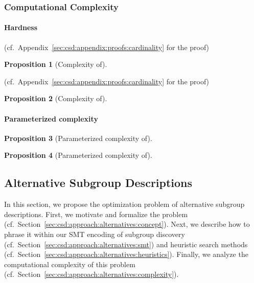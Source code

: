 \documentclass{article}
\newtheorem{proposition}{Proposition}
\theoremstyle{definition}
\begin{document}
\subsubsection{Computational Complexity}
\label{sec:csd:approach:cardinality:complexity}

\paragraph{Hardness}

(cf.~Appendix~\ref{sec:csd:appendix:proofs:cardinality} for the proof)

\begin{proposition}[Complexity of]
	\label{prop:csd:complexity-cardinality-perfect-box}
\end{proposition}

(cf.~Appendix~\ref{sec:csd:appendix:proofs:cardinality} for the proof)

\begin{proposition}[Complexity of]
	\label{prop:csd:complexity-cardinality-imperfect-box}
\end{proposition}

\paragraph{Parameterized complexity}

\begin{proposition}[Parameterized complexity of]
	\label{prop:csd:complexity-unconstrained-xp}
\end{proposition}

\begin{proposition}[Parameterized complexity of]
	\label{prop:csd:complexity-cardinality-xp}
\end{proposition}

\subsection{Alternative Subgroup Descriptions}
\label{sec:csd:approach:alternatives}

In this section, we propose the optimization problem of alternative subgroup descriptions.
First, we motivate and formalize the problem (cf.~Section~\ref{sec:csd:approach:alternatives:concept}).
Next, we describe how to phrase it within our SMT encoding of subgroup discovery (cf.~Section~\ref{sec:csd:approach:alternatives:smt}) and heuristic search methods (cf.~Section~\ref{sec:csd:approach:alternatives:heuristics}).
Finally, we analyze the computational complexity of this problem (cf.~Section~\ref{sec:csd:approach:alternatives:complexity}).
\end{document}
